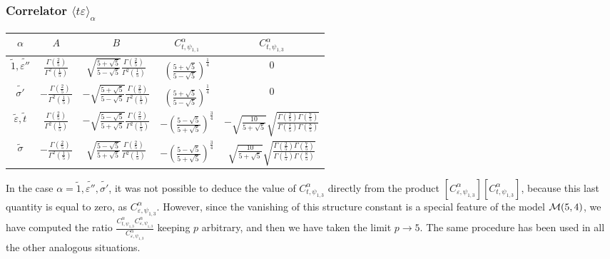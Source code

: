 \documentclass[a4paper,12pt]{report}
\begin{document}
\subsubsection{Correlator $\langle t\varepsilon\rangle_{\alpha}$}
\begin{center}
\begin{tabular}{|c|c|c|c|c|}\hline
$\alpha$ &  $A$  & $ B$ & $ C_{t,\psi_{1,1}}^{\alpha}$ & $ C_{t,\psi_{1,3}}^{\alpha}$  \\
\hline

$\tilde{1}, \tilde{\varepsilon''}$ & $\frac{\Gamma \left(\frac{2}{5} \right)}{\Gamma ^{2}\left(\frac{1}{5}
\right)}$ &
$\sqrt{\frac{5+\sqrt{5}}{5-\sqrt{5}}}\frac{\Gamma \left(\frac{2}{5} \right)}{\Gamma ^{2}\left(\frac{1}{5} \right)}$& $\left(\frac{5+\sqrt{5}}{5-\sqrt{5}} \right)^{\frac{1}{4}}$ & $0$ \\

$\tilde{\sigma'}$ & $-\frac{\Gamma \left(\frac{2}{5} \right)}{\Gamma ^{2}\left(\frac{1}{5} \right)}$ & $-\sqrt{\frac{5+\sqrt{5}}{5-\sqrt{5}}}\frac{\Gamma \left(\frac{2}{5} \right)}{\Gamma ^{2}\left(\frac{1}{5} \right)}$&  $\left(\frac{5+\sqrt{5}}{5-\sqrt{5}} \right)^{\frac{1}{4}}$ & $0$ \\

$\tilde{\varepsilon}, \tilde{t}$ & $\frac{\Gamma \left(\frac{2}{5} \right)}{\Gamma ^{2}\left(\frac{1}{5} \right)}$ & $-\sqrt{\frac{5-\sqrt{5}}{5+\sqrt{5}}}\frac{\Gamma \left(\frac{2}{5} \right)}{\Gamma ^{2}\left(\frac{1}{5} \right)}$&  $-\left(\frac{5-\sqrt{5}}{5+\sqrt{5}} \right)^{\frac{3}{4}}$ & $-\sqrt{\frac{10}{5+\sqrt{5}}}\sqrt{\frac{\Gamma \left(\frac{2}{5} \right)\Gamma \left(\frac{7}{5} \right)}{\Gamma \left(\frac{1}{5} \right)\Gamma \left(\frac{8}{5} \right)}}$ \\

$\tilde{\sigma}$ & $-\frac{\Gamma \left(\frac{2}{5} \right)}{\Gamma ^{2}\left(\frac{1}{5} \right)}$ &
$\sqrt{\frac{5-\sqrt{5}}{5+\sqrt{5}}}\frac{\Gamma \left(\frac{2}{5} \right)}{\Gamma ^{2}\left(\frac{1}{5}
\right)}$& $-\left(\frac{5-\sqrt{5}}{5+\sqrt{5}} \right)^{\frac{3}{4}}$ &
$\sqrt{\frac{10}{5+\sqrt{5}}}\sqrt{\frac{\Gamma \left(\frac{2}{5} \right)\Gamma \left(\frac{7}{5} \right)}{\Gamma
\left(\frac{1}{5} \right)\Gamma \left(\frac{8}{5} \right)}}$
\\ \hline
\end{tabular}
\end{center}


In the case $ \alpha=\tilde{1},\tilde{\varepsilon''},\tilde{\sigma'}$, it was not possible to deduce the value of
$C_{ t, \psi _{1,3}}^{\alpha}$ directly from the product $\left[C_{ \varepsilon, \psi _{1,3}}^{\alpha}
\right]\left[C_{ t, \psi _{1,3}}^{\alpha} \right]$, because this last quantity is equal to zero, as $ C_{
\varepsilon,\psi _{1,3}}^{\alpha}$. However, since the vanishing of this structure constant is a special feature
of the model ${\cal M}(5,4)$, we have computed the ratio $ \frac{C_{t,\psi _{1,3}}^{\alpha}C_{\varepsilon,\psi
_{1,3}}^{\alpha}}{C_{\varepsilon,\psi _{1,3}}^{\alpha}}$ keeping $p$ arbitrary, and then we have taken the limit
$ p\rightarrow 5$. The same procedure has been used in all the other analogous situations.
\end{document}
